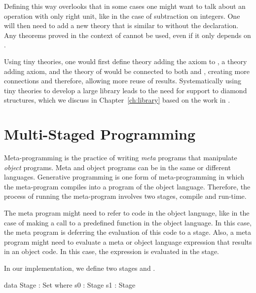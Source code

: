 Defining  this way overlooks that in some cases one might want to talk about an operation with only right unit, like in the case of subtraction on integers. One will then need to add a new theory that is similar to  without the  declaration. Any theorems proved in the context of  cannot be used, even if it only depends on . 

Using tiny theories, one would first define  theory adding the  axiom to , a  theory adding  axiom, and the theory of  would be connected to both  and , creating more connections and therefore, allowing more reuse of results. Systematically using tiny theories to develop a large library leads to the need for support to diamond structures, which we discuss in Chapter~\ref{ch:library} based on the work in \cite{carette2018building}.  

\section{Multi-Staged Programming}
\label{sec:background:msp}
Meta-programming is the practice of writing \emph{meta} programs that manipulate \emph{object} programs. Meta and object programs can be in the same or different languages. Generative programming is one form of meta-programming in which the meta-program compiles into a program of the object language. Therefore, the process of running the meta-program involves two stages, compile and run-time. 

The meta program might need to refer to code in the object language, like in the case of making a call to a predefined function in the object language. In this case, the meta program is deferring the evaluation of this code to a  stage. 
Also, a meta program might need to evaluate a meta or object language expression that results in an object code. In this case, the expression is evaluated in the  stage. 

In our implementation, we define two stages  and . 
\begin{togcode}
data Stage : Set where
  s0 : Stage
  s1 : Stage
\end{togcode} 

